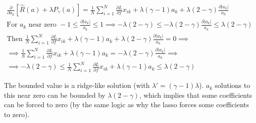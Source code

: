 \documentclass[11pt]{article}
\begin{document}
\begin{gather*}
\frac{\partial}{\partial a_{k}} [\hat{R}(a) + \lambda P_{\gamma}(a)] = 
\frac{1}{N} \sum_{i = 1}^{N} \frac{\partial L}{\partial f} x_{ik} + 
\lambda (\gamma - 1) a_{k} + 
\lambda (2 - \gamma) \frac{\partial |a_{k}|}{a_{k}}\\
\text{For } a_{k} \text{ near zero } 
-1 \le \frac{\partial |a_{k}|}{a_{k}} \le 1 \implies 
-\lambda (2 - \gamma) \le 
-\lambda (2 - \gamma) \frac{\partial |a_{k}|}{a_{k}} \le 
\lambda (2 - \gamma)\\
\text{Then } 
\frac{1}{N} \sum_{i = 1}^{N} \frac{\partial L}{\partial f} x_{ik} + 
\lambda (\gamma - 1) a_{k} + 
\lambda (2 - \gamma) \frac{\partial |a_{k}|}{a_{k}} = 0 \implies\\
\implies
\frac{1}{N} \sum_{i = 1}^{N} \frac{\partial L}{\partial f} x_{ik} + 
\lambda (\gamma - 1) a_{k} = 
- \lambda (2 - \gamma) \frac{\partial |a_{k}|}{a_{k}} \implies\\
\implies
-\lambda (2 - \gamma) \le 
\frac{1}{N} \sum_{i = 1}^{N} \frac{\partial L}{\partial f} x_{ik} + 
\lambda (\gamma - 1) a_{k} \le
\lambda (2 - \gamma)
\end{gather*}

\vspace{5mm}
\noindent
The bounded value is a ridge-like solution (with 
$\lambda ' = (\gamma - 1) \lambda$). $a_{k}$ solutions to this near zero can 
be bounded by $\lambda (2 - \gamma)$, which implies that some coefficients can 
be forced to zero (by the same logic as why the lasso forces some coefficients 
to zero).
\end{document}
